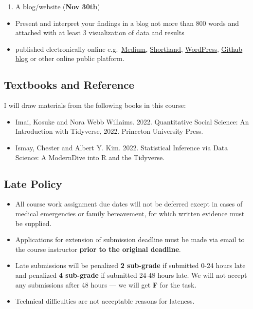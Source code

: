 \documentclass[
  letterpaper,
  DIV=11,
  numbers=noendperiod]{scrartcl}
\providecommand{\tightlist}{%
  \setlength{\itemsep}{0pt}\setlength{\parskip}{0pt}}
\begin{document}
\begin{enumerate}
\def\labelenumi{\arabic{enumi}.}
\setcounter{enumi}{2}
\tightlist
\item
  A blog/website (\textbf{Nov 30th})
\end{enumerate}

\begin{itemize}
\item
  Present and interpret your findings in a blog not more than 800 words
  and attached with at least 3 visualization of data and results
\item
  published electronically online
  e.g.~\href{https://medium.com/}{Medium},
  \href{https://shorthand.com/}{Shorthand},
  \href{https://wordpress.com/}{WordPress},
  \href{https://github.blog/}{Github blog} or other online public
  platform.
\end{itemize}

\subsection{Textbooks and Reference}\label{textbooks-and-reference}

I will draw materials from the following books in this course:

\begin{itemize}
\item
  Imai, Kosuke and Nora Webb Willaims. 2022. Quantitative Social
  Science: An Introduction with Tidyverse, 2022. Princeton University
  Press.
\item
  Ismay, Chester and Albert Y. Kim. 2022. Statistical Inference via Data
  Science: A ModernDive into R and the Tidyverse.
\end{itemize}

\subsection{Late Policy}\label{late-policy}

\begin{itemize}
\item
  All course work assignment due dates will not be deferred except in
  cases of medical emergencies or family bereavement, for which written
  evidence must be supplied.
\item
  Applications for extension of submission deadline must be made via
  email to the course instructor \textbf{prior to the original
  deadline}.
\item
  Late submissions will be penalized \textbf{2 sub-grade} if submitted
  0-24 hours late and penalized \textbf{4 sub-grade} if submitted 24-48
  hours late. We will not accept any submissions after 48 hours --- we
  will get \textbf{F} for the task.
\item
  Technical difficulties are not acceptable reasons for lateness.
\end{itemize}
\end{document}
